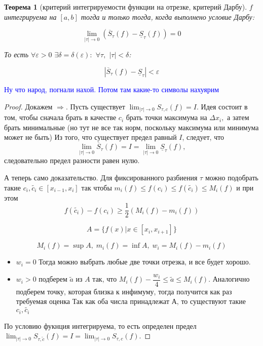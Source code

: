 \documentclass{article}
\theoremstyle{plain}
\newtheorem{theorem}{Теорема}
\theoremstyle{definition}
\theoremstyle{remark}
\renewcommand{\*}{\cdot}
\begin{document}
\begin{theorem}[критерий интегрируемости функции на отрезке, критерий Дарбу]
$f$ интегрируема на $[a, b]$ тогда и только тогда, когда выполнено условие Дарбу:

$$\lim_{|\tau| \to 0} (\overline{S}_{\tau}(f) - \underline{S}_{\tau}(f)) = 0$$


То есть $\forall \varepsilon > 0$ $\exists \delta = \delta(\varepsilon):$ $\forall \tau,$ $|\tau| < \delta$:

$$|\overline{S}_{\tau}(f) - \underline{S}_{\tau}| < \varepsilon$$



\end{theorem}
\textcolor{blue}{Ну что народ, погнали нахой. Потом там какие-то символы нахуярим}
\begin{proof}
Докажем $\Rightarrow.$ Пусть существует $\lim_{|\tau| \to 0} S_{\tau, c}(f) = I.$ Идея состоит в том, чтобы сначала брать в качестве $c_i$ брать точки максимума на $\Delta x_i,$ а затем брать минимальные (но тут не все так норм, поскольку максимума или минимума может не быть) Из того, что существует предел равный $I$, следует, что $$\lim_{|\tau| \to 0}\overline{S}_{\tau}(f) = I = \lim_{|\tau| \to 0}\underline{S}_{\tau}(f),$$ следовательно предел разности равен нулю. 

А теперь само доказательство. Для фиксированного разбиения $\tau$ можно подобрать такие $c_i, \widetilde{c_i} \in [x_{i-1}, x_{i}]$ так чтобы $m_i(f) \leq f(c_i) \leq f(\widetilde{c_i}) \leq M_i(f)$ и при этом 
\begin{equation}\label{eq1}
   f(\widetilde{c_i}) - f(c_i) \geq \frac{1}{2}(M_i(f) - m_i(f)) 
\end{equation}

$$A=\{f(x) | x\in [x_i, x_{i+1}]\}$$

$$M_i(f) = \sup A, \;m_i(f) = \inf A,\; w_i = M_i(f) - m_i(f)$$

\begin{itemize}
    \item $w_i = 0$ Тогда можно выбрать любые две точки отрезка, и все будет хорошо.
    \item $w_i > 0$ подберем $\widetilde{a}$ из $A$  так, что  $M_i(f) - \dfrac{w_i}{4} \leq \widetilde{a} \leq M_i(f).$ Аналогично подберем точку, которая близка к инфимуму, тогда получится как раз требуемая оценка Так как оба числа принадлежат А, то существуют такие $c_i, \widetilde{c_i}$
\end{itemize}
По условию фукнция интегрируема, то есть определен предел $\lim_{|\tau| \to 0} S_{\tau, \widetilde{c}}(f) = I = \lim_{|\tau| \to 0}S_{\tau, c}(f)$.


\end{proof}
\end{document}
